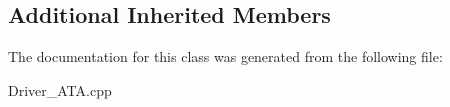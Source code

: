 \subsection*{Additional Inherited Members}


The documentation for this class was generated from the following file\+:\begin{DoxyCompactItemize}
\item 
Driver\+\_\+\+A\+T\+A.\+cpp\end{DoxyCompactItemize}
